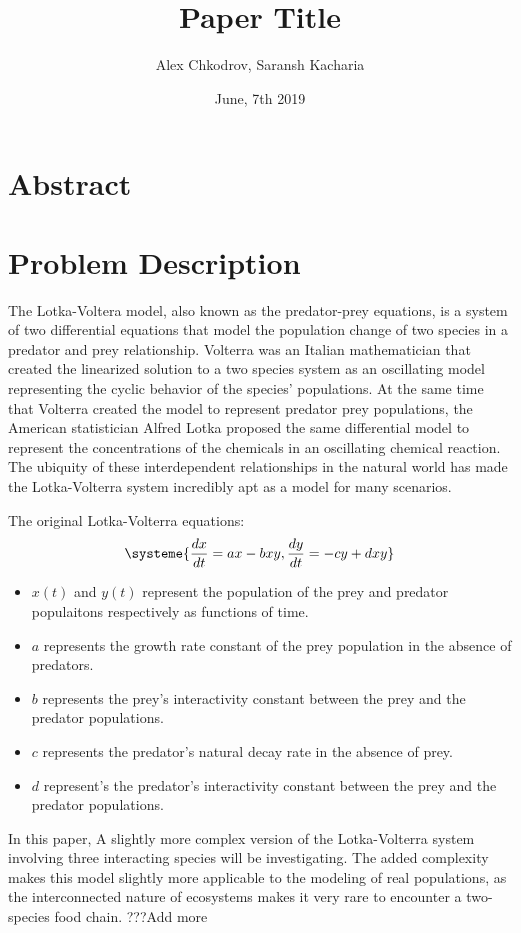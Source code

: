 \documentclass[11pt,oneside]{article}
\title{Paper Title}
\author{Alex Chkodrov, Saransh Kacharia}
\date{June, 7th 2019}
\begin{document}
	\maketitle
	\pagestyle{fancy}
	\section{Abstract}
	\section{Problem Description}
	The Lotka-Voltera model, also known as the predator-prey equations, is a system of two differential equations that model the population change of two species in a predator and prey relationship. Volterra was an Italian mathematician that created the linearized solution to a two species system as an oscillating model representing the cyclic behavior of the species' populations. At the same time that Volterra created the model to represent predator prey populations, the American statistician Alfred Lotka proposed the same differential model to represent the  concentrations of the chemicals in an oscillating chemical reaction. The ubiquity of these interdependent relationships in the natural world has made the Lotka-Volterra system incredibly apt as a model for many scenarios.
	
	The original Lotka-Volterra equations:
	\begin{equation}
	\systeme{
		\frac{dx}{dt} = ax - bxy,
		\frac{dy}{dt} = -cy + dxy
	}
	\end{equation}
	\begin{itemize}
		\item $x(t)$ and $y(t)$ represent the population of the prey and predator populaitons respectively as functions of time.
		\item $a$ represents the growth rate constant of the prey population in the absence of predators.
		\item $b$ represents the prey's interactivity constant between the prey and the predator populations.
		\item $c$ represents the predator's natural decay rate in the absence of prey.
		\item $d$ represent's the predator's interactivity constant between the prey and the predator populations.
	\end{itemize}
	
	
	In this paper, A slightly more complex version of the Lotka-Volterra system involving three interacting species will be investigating. The added complexity makes this model slightly more applicable to the modeling of real populations, as the interconnected nature of ecosystems makes it very rare to encounter a two-species food chain. ???Add more
	
\end{document}
